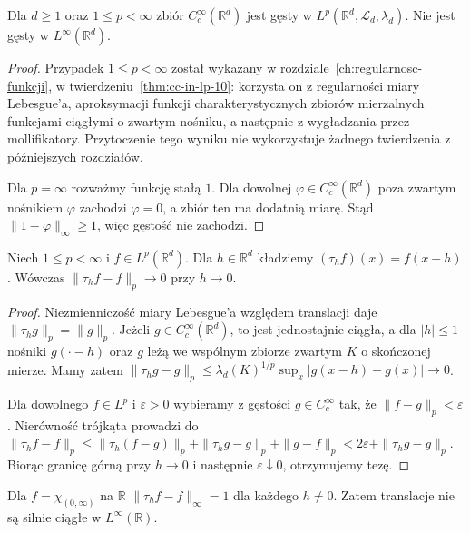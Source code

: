 \begin{twierdzenie}
\label{thm:cc-dense-lp-14}
Dla $d\ge1$ oraz $1\le p<\infty$ zbiór
$C_c^\infty(\mathbb R^d)$ jest gęsty w
$L^p(\mathbb R^d,\mathcal L_d,\lambda_d)$.
Nie jest gęsty w $L^\infty(\mathbb R^d)$.
\end{twierdzenie}
\begin{proof}
Przypadek $1\le p<\infty$ został wykazany
w rozdziale~\ref{ch:regularnosc-funkcji},
w twierdzeniu~\ref{thm:cc-in-lp-10}:
korzysta on z regularności miary Lebesgue'a,
aproksymacji funkcji charakterystycznych zbiorów mierzalnych
funkcjami ciągłymi o zwartym nośniku,
a następnie z wygładzania przez mollifikatory.
Przytoczenie tego wyniku nie wykorzystuje
żadnego twierdzenia z późniejszych rozdziałów.

Dla $p=\infty$ rozważmy funkcję stałą $1$.
Dla dowolnej $\varphi\in C_c^\infty(\mathbb R^d)$
poza zwartym nośnikiem $\varphi$ zachodzi $\varphi=0$,
a zbiór ten ma dodatnią miarę. Stąd
$\|1-\varphi\|_\infty\ge1$, więc gęstość nie zachodzi.
\end{proof}

\begin{twierdzenie}
\label{thm:translation-lp-14}
Niech $1\le p<\infty$ i $f\in L^p(\mathbb R^d)$.
Dla $h\in\mathbb R^d$ kładziemy
$(\tau_hf)(x)=f(x-h)$.
Wówczas $\|\tau_hf-f\|_p\to0$ przy $h\to0$.
\end{twierdzenie}
\begin{proof}
Niezmienniczość miary Lebesgue'a względem translacji
daje $\|\tau_hg\|_p=\|g\|_p$.
Jeżeli $g\in C_c^\infty(\mathbb R^d)$, to jest
jednostajnie ciągła, a dla $|h|\le1$
nośniki $g(\cdot-h)$ oraz $g$ leżą we wspólnym
zbiorze zwartym $K$ o skończonej mierze.
Mamy zatem
$\|\tau_hg-g\|_p\le
\lambda_d(K)^{1/p}\sup_x|g(x-h)-g(x)|\to0$.

Dla dowolnego $f\in L^p$ i $\varepsilon>0$
wybieramy z gęstości $g\in C_c^\infty$ tak, że
$\|f-g\|_p<\varepsilon$.
Nierówność trójkąta prowadzi do
$\|\tau_hf-f\|_p\le
\|\tau_h(f-g)\|_p+\|\tau_hg-g\|_p+\|g-f\|_p
<2\varepsilon+\|\tau_hg-g\|_p$.
Biorąc granicę górną przy $h\to0$ i następnie
$\varepsilon\downarrow0$, otrzymujemy tezę.
\end{proof}

\begin{przyklad}[Dlaczego $p=\infty$ jest inny]
Dla $f=\chi_{(0,\infty)}$ na $\mathbb R$
$\|\tau_hf-f\|_\infty=1$ dla każdego $h\ne0$.
Zatem translacje nie są silnie ciągłe w
$L^\infty(\mathbb R)$.
\end{przyklad}

